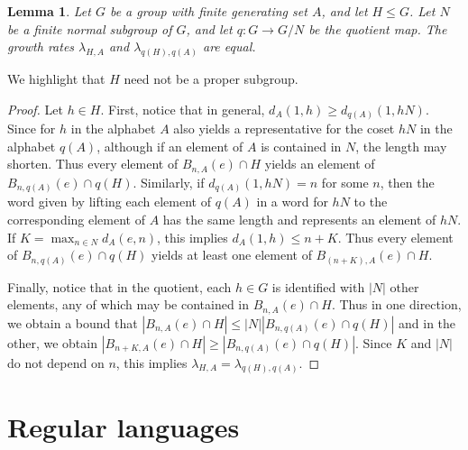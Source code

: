 \documentclass[11pt,letterpaper]{amsart}
\newtheorem{lemma}[theorem]{Lemma}
\theoremstyle{definition}
\theoremstyle{plain}
\theoremstyle{TheoremNum}
\begin{document}
\begin{lemma}\label{lem:quotient-by-finite-normal}
    Let $G$ be a group with finite generating set $A$, and let $H \leq G$. Let $N$ be a finite normal subgroup of $G$, and let $q : G \rightarrow G/N$ be the quotient map. The growth rates $\lambda_{H,A}$ and $\lambda_{q(H), q(A)}$ are equal.
\end{lemma}
We highlight that $H$ need not be a proper subgroup.
\begin{proof}
    Let $h \in H$. First, notice that in general, $d_{A}(1,h) \geq d_{q(A)}(1, h N)$. Since for $h$ in the alphabet $A$ also yields a representative for the coset $hN$ in the alphabet $q(A)$, although if an element of $A$ is contained in $N$, the length may shorten. Thus every element of $B_{n,A}(e) \cap H$ yields an element of $B_{n, q(A)}(e) \cap q(H)$. Similarly, if $d_{q(A)}(1, hN) = n$ for some $n$, then the word given by lifting each element of $q(A)$ in a word for $hN$ to the corresponding element of $A$ has the same length and represents an element of $hN$. If $K = \max_{n \in N} d_A (e,n)$, this implies $d_A (1, h) \leq n +K$. Thus every element of $B_{n , q(A)}(e) \cap q(H)$ yields at least one element of $B_{(n+K), A}(e) \cap H$.
    
    Finally, notice that in the quotient, each $h \in G$ is identified with $|N|$ other elements, any of which may be contained in $B_{n,A}(e) \cap H$. Thus in one direction, we obtain a bound that $|B_{n,A}(e) \cap H| \leq |N||B_{n, q(A)}(e) \cap q(H)|$ and in the other, we obtain $|B_{n+K , A} (e) \cap H | \geq |B_{n , q(A)} (e) \cap q(H)|$. Since $K$ and $|N|$ do not depend on $n$, this implies $\lambda_{H,A} = \lambda_{q(H), q(A)}$. 
\end{proof}


\section{Regular languages}
\end{document}

